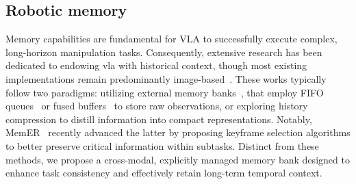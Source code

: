 \subsection{Robotic memory}
Memory capabilities are fundamental for VLA to successfully execute complex, long-horizon manipulation tasks. 
Consequently, extensive research has been dedicated to endowing vla with historical context, though most existing implementations remain predominantly image-based~\cite{Huang2022VisualLM}. 
These works typically follow two paradigms: utilizing external memory banks~\cite{Li2025MAPVLAMP, Torne2025LearningLD, Fang2025SAM2ActIV, Huang2023OutOS, Zhu2020VisionDialogNB, Zheng2024TraceVLAVT, Hu20253DLLMMemLS}, that employ FIFO queues~\cite{Sridhar2025MemERSU} or fused buffers~\cite{Shi2025MemoryVLAPM} to store raw observations, or exploring history compression to distill information into compact representations. Notably, MemER~\cite{Sridhar2025MemERSU} recently advanced the latter by proposing keyframe selection algorithms to better preserve critical information within subtasks.
Distinct from these methods, we propose a cross-modal, explicitly managed memory bank designed to enhance task consistency and effectively retain long-term temporal context.









